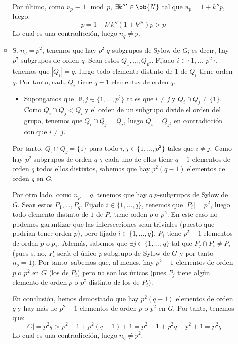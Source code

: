 \begin{ejercicio}
\begin{itemize}
\begin{itemize}
            Por último, como $n_p\equiv 1 \mod p$, $\exists k'''\in\bb{N}$ tal que $n_p = 1 + k''p$, luego:
            \begin{equation*}
                p = 1 + k'k''(1+k''')p > p
            \end{equation*}
            Lo cual es una contradicción, luego $n_q\neq p$.

            \item Si $n_q=p^2$, tenemos que hay $p^2$ $q$-subgrupos de Sylow de $G$; es decir, hay $p^2$ subgrupos de orden $q$. Sean estos $Q_1,\ldots,Q_{p^2}$. Fijado $i\in \{1,\ldots,p^2\}$, tenemos que $|Q_i|=q$, luego todo elemento distinto de $1$ de $Q_i$ tiene orden $q$. Por tanto, cada $Q_i$ tiene $q-1$ elementos de orden $q$.
            \begin{itemize}
                \item Supongamos que $\exists i,j\in\{1,\ldots,p^2\}$ tales que $i\neq j$ y $Q_i\cap Q_j \neq \{1\}$. Como $Q_i\cap Q_j< Q_i$ y el orden de un subgrupo divide el orden del grupo, tenemos que $Q_i\cap Q_j=Q_i$, luego $Q_i=Q_j$, en contradicción con que $i\neq j$.
            \end{itemize}
            Por tanto, $Q_i\cap Q_j=\{1\}$ para todo $i,j\in\{1,\ldots,p^2\}$ tales que $i\neq j$. Como hay $p^2$ subgrupos de orden $q$ y cada uno de ellos tiene $q-1$ elementos de orden $q$ todos ellos distintos, sabemos que hay $p^2(q-1)$ elementos de orden $q$ en $G$.

            Por otro lado, como $n_p=q$, tenemos que hay $q$ $p$-subgrupos de Sylow de $G$. Sean estos $P_1,\ldots,P_q$. Fijado $i\in \{1,\ldots,q\}$, tenemos que $|P_i|=p^2$, luego todo elemento distinto de $1$ de $P_i$ tiene orden $p$ o $p^2$. En este caso no podemos garantizar que las intersecciones sean triviales (puesto que podrían tener orden $p$), pero fijado $i\in \{1,\ldots,q\}$, $P_i$ tiene $p^2-1$ elementos de orden $p$ o $p_2$. Además, sabemos que $\exists j\in\{1,\ldots,q\}$ tal que $P_j\cap P_i\neq P_i$ (pues si no, $P_i$ sería el único $p$-subgrupo de Sylow de $G$ y por tanto $n_p=1$). Por tanto, sabemos que, al menos, hay $p^2-1$ elementos de orden $p$ o $p^2$ en $G$ (los de $P_i$) pero no son los únicos (pues $P_j$ tiene algún elemento de orden $p$ o $p^2$ distinto de los de $P_i$).

            En conclusión, hemos demostrado que hay $p^2(q-1)$ elementos de orden $q$ y hay más de $p^2-1$ elementos de orden $p$ o $p^2$ en $G$. Por tanto, tenemos que:
            \begin{equation*}
                |G| = p^2q > p^2-1 + p^2(q-1) + 1 = p^2-1 + p^2q - p^2 + 1 = p^2q
            \end{equation*}
            Lo cual es una contradicción, luego $n_q\neq p^2$.
        \end{itemize}


\end{itemize}
\end{ejercicio}
